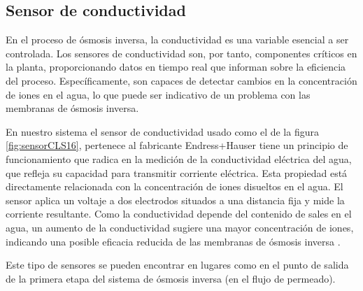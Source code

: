 \subsection{Sensor de conductividad} \label{sec:sesor_conductividad}

En el proceso de ósmosis inversa, la conductividad es una variable esencial a ser controlada. Los sensores de
conductividad son, por tanto, componentes críticos en la planta, proporcionando datos en tiempo real que informan
sobre la eficiencia del proceso. Específicamente, son capaces de detectar cambios en la concentración de iones
en el agua, lo que puede ser indicativo de un problema con las membranas de ósmosis inversa.

En nuestro sistema el sensor de conductividad usado como el de la figura \ref{fig:sensorCLS16}, pertenece al fabricante Endress+Hauser tiene un principio de funcionamiento que radica en la medición de la
conductividad eléctrica del agua,
que refleja su capacidad para transmitir corriente eléctrica. Esta propiedad está directamente relacionada
con la concentración de iones disueltos en el agua. El sensor aplica un voltaje a dos electrodos situados a una
distancia fija y mide la corriente resultante. Como la conductividad depende del contenido de sales en el agua,
un aumento de la conductividad sugiere una mayor concentración de iones, indicando una posible eficacia reducida
de las membranas de ósmosis inversa \cite{endress+hauserAnalogConductivitySensor}.


Este tipo de sensores se pueden encontrar en lugares como en el punto de salida de la primera
etapa del sistema de ósmosis inversa (en el flujo de permeado).

